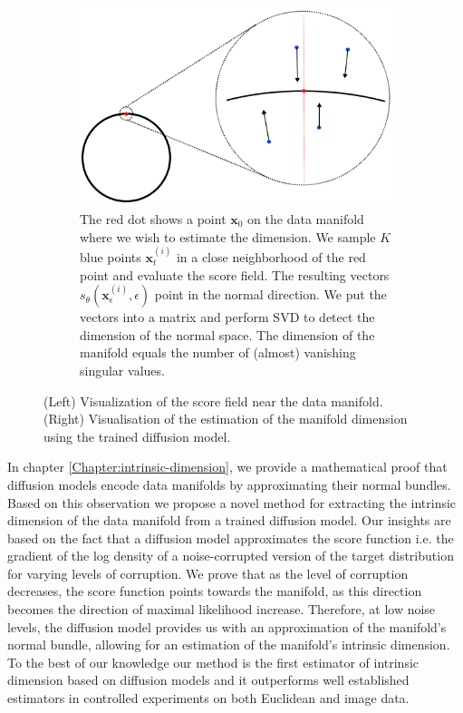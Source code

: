 \begin{figure}[h]
\begin{subfigure}[t]{0.45\linewidth}
        \includegraphics[width=\linewidth]{Outline/figures/id-diff/drawing.png}
        \caption{The red dot shows a point $\textbf{x}_0$ on the data manifold where we wish to estimate the dimension. We sample $K$ blue points $\textbf{x}_t^{(i)}$ in a close neighborhood of the red point and evaluate the score field. The resulting vectors $s_\theta(\textbf{x}_\epsilon^{(i)}, \epsilon)$ point in the normal direction. We put the vectors into a matrix and perform SVD to detect the dimension of the normal space. The dimension of the manifold equals the number of (almost) vanishing singular values.}
        \label{fig:zoom}
    \end{subfigure}
    \caption{(Left) Visualization of the score field near the data manifold. (Right) Visualisation of the estimation of the manifold dimension using the trained diffusion model.}
    \label{fig:score_estimation}
\end{figure}



In chapter \ref{Chapter:intrinsic-dimension}, we provide a mathematical proof
that diffusion models encode data manifolds by
approximating their normal bundles. Based on
this observation we propose a novel method for
extracting the intrinsic dimension of the data manifold from a trained diffusion model. Our insights
are based on the fact that a diffusion model approximates the score function i.e. the gradient
of the log density of a noise-corrupted version of
the target distribution for varying levels of corruption. We prove that as the level of corruption
decreases, the score function points towards the
manifold, as this direction becomes the direction
of maximal likelihood increase. Therefore, at
low noise levels, the diffusion model provides us
with an approximation of the manifold’s normal
bundle, allowing for an estimation of the manifold’s intrinsic dimension. To the best of our
knowledge our method is the first estimator of
intrinsic dimension based on diffusion models
and it outperforms well established estimators in
controlled experiments on both Euclidean and
image data.

